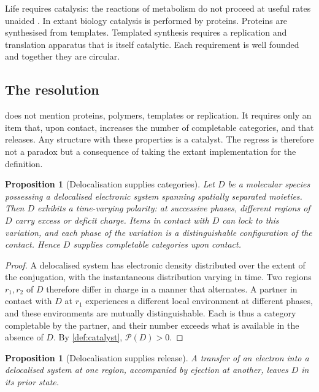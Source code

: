 \documentclass[11pt,twocolumn,a4paper]{article}
\theoremstyle{plain}
\newtheorem{proposition}[theorem]{Proposition}
\theoremstyle{definition}
\theoremstyle{remark}
\newcommand{\prov}{\mathcal{P}}
\begin{document}
Life requires catalysis: the reactions of metabolism do not proceed at useful
rates unaided \citep{wolfenden2001}. In extant biology catalysis is performed by
proteins. Proteins are synthesised from templates. Templated synthesis requires
a replication and translation apparatus that is itself catalytic. Each
requirement is well founded and together they are circular.

\subsection{The resolution}

 does not mention proteins, polymers, templates or
replication. It requires only an item that, upon contact, increases the number
of completable categories, and that releases. Any structure with these
properties is a catalyst. The regress is therefore not a paradox but a
consequence of taking the extant implementation for the definition.

\begin{proposition}[Delocalisation supplies categories]
\label{prop:delocalisation}
Let $D$ be a molecular species possessing a delocalised electronic system
spanning spatially separated moieties. Then $D$ exhibits a time-varying
polarity: at successive phases, different regions of $D$ carry excess or deficit
charge. Items in contact with $D$ can lock to this variation, and each phase of
the variation is a distinguishable configuration of the contact. Hence $D$
supplies completable categories upon contact.
\end{proposition}

\begin{proof}
A delocalised system has electronic density distributed over the extent of the
conjugation, with the instantaneous distribution varying in time. Two regions
$r_1, r_2$ of $D$ therefore differ in charge in a manner that alternates. A
partner in contact with $D$ at $r_1$ experiences a different local environment
at different phases, and these environments are mutually distinguishable. Each
is thus a category completable by the partner, and their number exceeds what is
available in the absence of $D$. By \cref{def:catalyst}, $\prov(D) > 0$.
\end{proof}

\begin{proposition}[Delocalisation supplies release]
\label{prop:delocalisation-release}
A transfer of an electron into a delocalised system at one region, accompanied
by ejection at another, leaves $D$ in its prior state.
\end{proposition}
\end{document}
